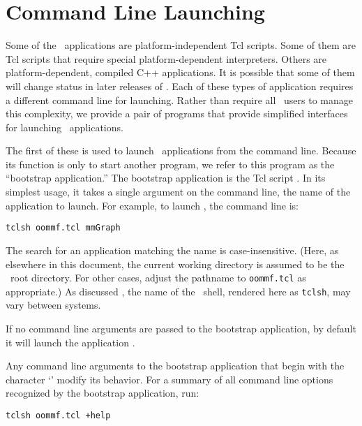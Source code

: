 
\chapter{Command Line Launching}\label{sec:cll}

Some of the \OOMMF\ applications are platform-independent Tcl
scripts.  Some of them are Tcl scripts that require special
platform-dependent interpreters.  Others are platform-dependent,
compiled C++ applications.  It is possible that some of them will
change status in later releases of \OOMMF.  Each of these types
of application requires a different command line for launching.
Rather than require all \OOMMF\ users to manage this complexity,
we provide a pair of programs that provide simplified interfaces
for launching \OOMMF\ applications.

The first of these is used to launch \OOMMF\ applications from the
command line.  Because its function is only to start another
program, we refer to this program as the ``bootstrap application.''
The bootstrap application is the Tcl script .
In its simplest usage, it takes a single argument on the command line,
the name of the application to launch.  For example, to launch
,
the command line is:
\begin{verbatim}
tclsh oommf.tcl mmGraph
\end{verbatim}
The search for an application matching the name is case-insensitive.
(Here, as elsewhere in this document, the current working
directory is assumed to be the \OOMMF\ root
directory.  For other cases, adjust the pathname to {\tt oommf.tcl} as
appropriate.)  As discussed , the name of the \Tcl\ shell,
rendered here as \verb+tclsh+, may vary between systems.

If no command line arguments are passed to the bootstrap application,
by default it will launch the application
.

Any command line arguments to the bootstrap
application that begin with the character `\cd{+}' modify its
behavior.
For a summary of all command line options recognized by the bootstrap
application, run:
\begin{verbatim}
tclsh oommf.tcl +help
\end{verbatim}

